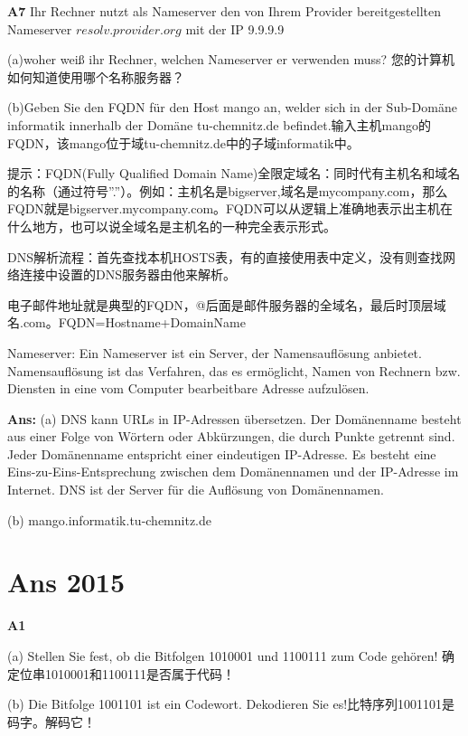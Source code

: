 \documentclass[fleqn]{article}
\begin{document}
\noindent\textbf{A7} Ihr Rechner nutzt als Nameserver den von Ihrem Provider bereitgestellten Nameserver $resolv.provider.org$ mit der IP 9.9.9.9

(a)woher weiß ihr Rechner, welchen Nameserver er verwenden muss? 您的计算机如何知道使用哪个名称服务器？

(b)Geben Sie den FQDN für den Host mango an, welder sich in der Sub-Domäne informatik innerhalb der Domäne tu-chemnitz.de befindet.输入主机mango的FQDN，该mango位于域tu-chemnitz.de中的子域informatik中。

提示：FQDN(Fully Qualified Domain Name)全限定域名：同时代有主机名和域名的名称（通过符号”.”）。例如：主机名是bigserver,域名是mycompany.com，那么FQDN就是bigserver.mycompany.com。FQDN可以从逻辑上准确地表示出主机在什么地方，也可以说全域名是主机名的一种完全表示形式。

DNS解析流程：首先查找本机HOSTS表，有的直接使用表中定义，没有则查找网络连接中设置的DNS服务器由他来解析。

电子邮件地址就是典型的FQDN，@后面是邮件服务器的全域名，最后时顶层域名.com。FQDN=Hostname+DomainName

Nameserver: Ein Nameserver ist ein Server, der Namensauflösung anbietet. Namensauflösung ist das Verfahren, das es ermöglicht, Namen von Rechnern bzw. Diensten in eine vom Computer bearbeitbare Adresse aufzulösen.

\textbf{Ans:} (a) DNS kann URLs in IP-Adressen übersetzen. Der Domänenname besteht aus einer Folge von Wörtern oder Abkürzungen, die durch Punkte getrennt sind. Jeder Domänenname entspricht einer eindeutigen IP-Adresse. Es besteht eine Eins-zu-Eins-Entsprechung zwischen dem Domänennamen und der IP-Adresse im Internet. DNS ist der Server für die Auflösung von Domänennamen.

(b) mango.informatik.tu-chemnitz.de


\section{Ans 2015}

\textbf{A1} 

\qquad (a) Stellen Sie fest, ob die Bitfolgen 1010001 und 1100111 zum Code gehören! 确定位串1010001和1100111是否属于代码！

\qquad (b) Die Bitfolge 1001101 ist ein Codewort. Dekodieren Sie es!比特序列1001101是码字。解码它！
\end{document}
